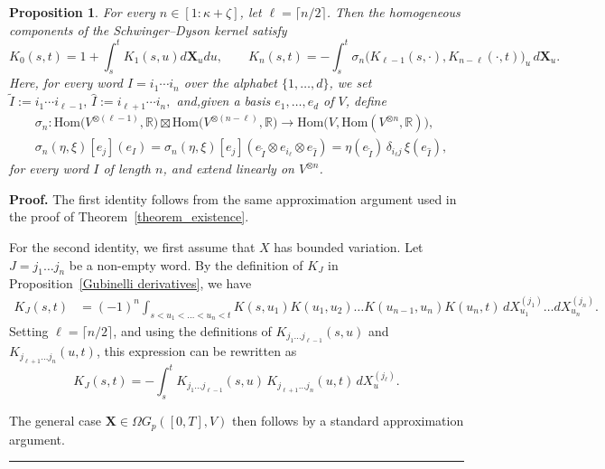 \documentclass{article}%
\newtheorem{proposition}[theorem]{Proposition}
\newenvironment{proof}[1][Proof]{\noindent\textbf{#1.} }{\ \rule{0.5em}{0.5em}}
\begin{document}
\begin{proposition}\label{numerical_scheme_rep}
For every \(n\in [1:\kappa+\zeta]\), let \(\ell=\lceil n/2\rceil\). Then the homogeneous components of the Schwinger--Dyson kernel satisfy
\begin{equation}\label{alternative_representation_levelwise}
K_0(s,t)=1 +  \int_s^t  K_{1}(s,u) d\mathbf{X}_u du,
\qquad
K_n(s,t)
=
-\int_s^t \sigma_n\bigl(K_{\ell-1}(s, \cdot),K_{n-\ell}(\cdot, t)\bigr)_u\,d\mathbf X_u .
\end{equation}
Here, for every word \(I=i_1\cdots i_n\) over the alphabet \(\{1,\dots,d\}\), we set
\(
\tilde I:=i_1\cdots i_{\ell-1},\,
\hat I:=i_{\ell+1}\cdots i_n,
\)
and,given a basis \(e_1,\dots,e_d\) of \(V\), define
\begin{align*}
&\sigma_n:
\mathrm{Hom}\bigl(V^{\otimes(\ell-1)},\mathbb R\bigr)\boxtimes
\mathrm{Hom}\bigl(V^{\otimes(n-\ell)},\mathbb R\bigr)
\to
\mathrm{Hom}\bigl(V,\mathrm{Hom}(V^{\otimes n},\mathbb R)\bigr),\\
&\sigma_n(\eta,\xi)[e_j](e_I)
=
\sigma_n(\eta,\xi)[e_j](e_{\tilde I}\otimes e_{i_\ell}\otimes e_{\hat I})
=
\eta(e_{\tilde I})\,\delta_{i_\ell j}\,\xi(e_{\hat I}),
\end{align*}
for every word \(I\) of length \(n\), and extend linearly on \(V^{\otimes n}\).
\end{proposition}

\begin{proof}
The first identity follows from the same approximation argument used in the proof of Theorem~\ref{theorem_existence}.

For the second identity, we first assume that $X$ has bounded variation. Let $J = j_1 \dots j_n$ be a non-empty word. By the definition of $K_J$ in Proposition~\ref{Gubinelli derivatives}, we have
\begin{align*}
K_{J}(s,t) 
&= (-1)^{n} \int_{s < u_1 < \dots < u_n < t} 
K(s, u_1) K(u_1, u_2) \dots K(u_{n-1}, u_n) K(u_n, t)\,
dX^{(j_1)}_{u_1} \dots dX^{(j_n)}_{u_n}.
\end{align*}
Setting $\ell = \lceil n/2 \rceil$, and using the definitions of 
$K_{j_1 \dots j_{\ell-1}}(s,u)$ and $K_{j_{\ell+1} \dots j_n}(u,t)$, this expression can be rewritten as
\[
K_{J}(s,t)
= - \int_s^t K_{j_1 \dots j_{\ell-1}}(s,u)\,
K_{j_{\ell+1} \dots j_n}(u,t)\, dX^{(j_\ell)}_u.
\]

The general case $\mathbf{X} \in \Omega G_p([0, T], V)$ then follows by a standard approximation argument.
\end{proof}
\end{document}
